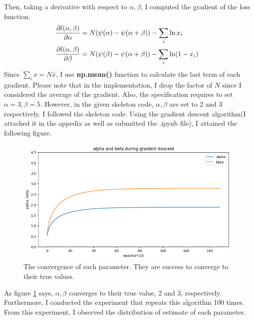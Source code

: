 \documentclass[10pt]{article}
\begin{document}
Then, taking a derivative with respect to $\alpha, \beta$, I computed the gradient of the loss function.
\begin{align}
    {\partial l(\alpha, \beta)\over \partial \alpha} &= N (\psi(\alpha) - \psi(\alpha + \beta)) - \sum_i \ln x_i \\
    {\partial l(\alpha, \beta)\over \partial \beta} &= N (\psi(\beta) - \psi(\alpha + \beta)) - \sum_i \ln (1-x_i)
\end{align}
Since $\sum_i x  = N\bar{x}$, I use \textbf{np.mean()} function to calculate the last term of each gradient. 
Please note that in the implementation, I drop the factor of $N$ since I considered the average of the gradient.
Also, the specification requires to set $\alpha = 3, \beta = 5$. 
However, in the given skeleton code, $\alpha,\beta$ are set to 2 and 3 respectively. 
I followed the skeleton code.
Using the gradient descent algorithm(I attached it in the appedix as well as submitted the .ipynb file), I attained the following figure. 
\clearpage
\begin{figure}[!h]
    \begin{center}
        \includegraphics[scale = 0.5]{"fig/fig1.png"}
    \end{center}
    \caption{The convergence of each parameter. They are success to converge to their true values.}
    \label{fig1}
\end{figure}
As figure \ref{fig1} says, $\alpha, \beta$ converges to their true value, 2 and 3, respectively. 
Furthermore, I conducted the experiment that repeats this algorithm 100 times. From this experiment, I observed the distribution of estimate of each parameter.
\end{document}
